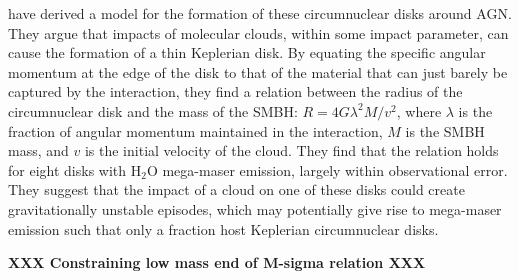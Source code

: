 \citet{wardle2012_bhmass} have derived a model for the formation of these circumnuclear disks around AGN. They argue that impacts of molecular clouds, within some impact parameter, can cause the formation of a thin Keplerian disk. By equating the specific angular momentum at the edge of the disk to that of the material that can just barely be captured by the interaction, they find a relation between the radius of the circumnuclear disk and the mass of the SMBH: $R=4G\lambda^2M/v^2$, where $\lambda$ is the fraction of angular momentum maintained in the interaction, $M$ is the SMBH mass, and $v$ is the initial velocity of the cloud. They find that the relation holds for eight disks with H$_2$O mega-maser emission, largely within observational error. They suggest that the impact of a cloud on one of these disks could create gravitationally unstable episodes, which may potentially give rise to mega-maser emission \citep{Milosavljevi_2004} such that only a fraction host Keplerian circumnuclear disks.

{\bf XXX Constraining low mass end of M-sigma relation XXX}

